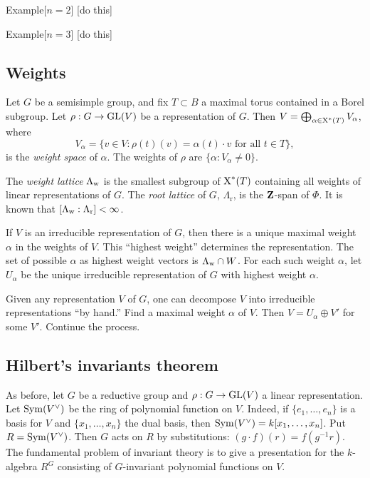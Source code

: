 \begin{enonce}[remark]{Example}[$n=2$]
[do this]
\end{enonce}

\begin{enonce}[remark]{Example}[$n=3$]
[do this]
\end{enonce}





\subsection{Weights}

Let $G$ be a semisimple group, and fix $T\subset B$ a maximal torus contained 
in a Borel subgroup. Let $\rho:G\to \operatorname{GL}(V)$ be a representation of 
$G$. Then $V=\bigoplus_{\alpha\in \operatorname{X}^\ast(T)} V_\alpha$, where 
\[
  V_\alpha = \{v\in V:\rho(t)(v) = \alpha(t)\cdot v\text{ for all }t\in T\} ,
\]
is the \emph{weight space} of $\alpha$. The weights of $\rho$ are 
$\{\alpha:V_\alpha\ne 0\}$. 

The \emph{weight lattice} $\Lambda_{\mathrm{w}}$ is the smallest subgroup of 
$\operatorname{X}^\ast(T)$ containing all weights of linear representations of $G$. 
The \emph{root lattice} of $G$, $\Lambda_\mathrm{r}$, is the $\mathbf{Z}$-span of 
$\Phi$. It is known that $[\Lambda_{\mathrm{w}}:\Lambda_\mathrm{r}]<\infty$. 

If $V$ is an irreducible representation of $G$, then there is a unique maximal 
weight $\alpha$ in the weights of $V$. This ``highest weight'' determines the 
representation. The set of possible $\alpha$ as highest weight vectors is 
$\Lambda_{\mathrm{w}}\cap W$. For each such weight $\alpha$, let $U_\alpha$ be the 
unique irreducible representation of $G$ with highest weight $\alpha$. 

Given any representation $V$ of $G$, one can decompose $V$ into irreducible 
representations ``by hand.'' Find a maximal weight $\alpha$ of $V$. Then 
$V=U_\alpha\oplus V'$ for some $V'$. Continue the process. 





\subsection{Hilbert's invariants theorem}

As before, let $G$ be a reductive group and $\rho:G\to \operatorname{GL}(V)$ a 
linear representation. Let $\operatorname{Sym}(V^\vee)$ be the ring of polynomial 
function on $V$. Indeed, if $\{e_1,\dots,e_n\}$ is a basis for $V$ and 
$\{x_1,\dots,x_n\}$ the dual basis, then 
$\operatorname{Sym}(V^\vee) = k[x_1,\dots,x_n]$. Put $R=\operatorname{Sym}(V^\vee)$. Then $G$ 
acts on $R$ by substitutions: $(g\cdot f)(r) = f(g^{-1} r)$. The fundamental 
problem of invariant theory is to give a presentation for the 
$k$-algebra $R^G$ consisting of $G$-invariant polynomial functions on $V$. 

